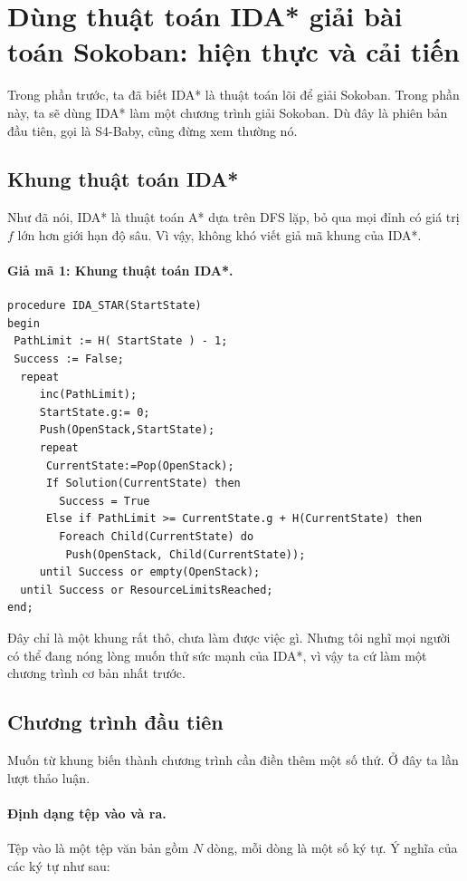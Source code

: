 \documentclass[11pt]{article}
\begin{document}
\section{Dùng thuật toán IDA* giải bài toán Sokoban: hiện thực và cải tiến}

Trong phần trước, ta đã biết IDA* là thuật toán lõi để giải Sokoban. Trong
phần này, ta sẽ dùng IDA* làm một chương trình giải Sokoban. Dù đây là phiên
bản đầu tiên, gọi là S4-Baby, cũng đừng xem thường nó.

\subsection{Khung thuật toán IDA*}

Như đã nói, IDA* là thuật toán A* dựa trên DFS lặp, bỏ qua mọi đỉnh có giá
trị \(f\) lớn hơn giới hạn độ sâu. Vì vậy, không khó viết giả mã khung của
IDA*.

\paragraph{Giả mã 1: Khung thuật toán IDA*.}
\begin{verbatim}
procedure IDA_STAR(StartState)
begin
 PathLimit := H( StartState ) - 1;
 Success := False;
  repeat
     inc(PathLimit);
     StartState.g:= 0;
     Push(OpenStack,StartState);
     repeat
      CurrentState:=Pop(OpenStack);
      If Solution(CurrentState) then
        Success = True
      Else if PathLimit >= CurrentState.g + H(CurrentState) then
        Foreach Child(CurrentState) do
         Push(OpenStack, Child(CurrentState));
     until Success or empty(OpenStack);
  until Success or ResourceLimitsReached;
end;
\end{verbatim}

Đây chỉ là một khung rất thô, chưa làm được việc gì. Nhưng tôi nghĩ mọi người
có thể đang nóng lòng muốn thử sức mạnh của IDA*, vì vậy ta cứ làm một
chương trình cơ bản nhất trước.

\subsection{Chương trình đầu tiên}

Muốn từ khung biến thành chương trình cần điền thêm một số thứ. Ở đây ta lần
lượt thảo luận.

\paragraph{Định dạng tệp vào và ra.}
Tệp vào là một tệp văn bản gồm \(N\) dòng, mỗi dòng là một số ký tự. Ý nghĩa
của các ký tự như sau:
\end{document}
